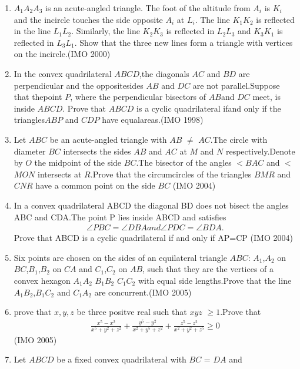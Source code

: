 \begin{enumerate}
\item ${A_{1}} {A_{2}} {A_{3}}$ is an acute-angled triangle. The foot of the altitude from ${A_{i}}$ is ${K_{i}}$ and the incircle touches the side opposite ${A_{i}}$ at ${L_{i}}$. The line ${K_{1}}{K_{2}}$ is reflected in the line ${L_{1}}{L_{2}}$. Similarly, the line ${K_{2}}{K_{3}}$ is reflected in ${L_{2}}{L_{3}}$ and ${K_{3}}{K_{1}}$ is reflected in ${L_{3}}{L_{1}}$. Show that the three new lines form a triangle with vertices on the incircle.\hfill(IMO 2000)
\item In the convex quadrilateral $ABCD$,the diagonals $AC$ and $BD$ are perpendicular and the oppositesides $AB$ and $DC$ are not parallel.Suppose that thepoint $P$, where the perpendicular bisectors of $AB$and $DC$ meet, is inside $ABCD$. Prove that $ABCD$ is a cyclic quadrilateral ifand only if the triangles$ABP$ and $CDP$ have equalareas.\hfill(IMO 1998) 
\item Let $ABC$ be an acute-angled triangle  with $AB$ $\neq$ $AC$.The circle with diameter $BC$ intersects the sides $AB$ and $AC$ at $M$ and $N$ respectively.Denote by $O$ the midpoint of the side $BC$.The bisector of the angles $<$$BAC$ and $<$$MON$ intersects at $R$.Prove that the circumcircles of the triangles $BMR$ and $CNR$ have a common point on the side $BC$ \hfill(IMO 2004)
 \item In a convex quadrilateral ABCD the diagonal BD does not bisect the angles ABC and CDA.The point P lies inside ABCD and satisfies
 \begin{align*}
 \angle{PBC}=\angle{DBA} and \angle{PDC}=\angle{BDA}.
 \end{align*}
Prove that ABCD is a cyclic quadrilateral if and only if AP=CP \hfill(IMO 2004)
	\item Six points are chosen on the sides of an equilateral triangle $ABC$:
     $A_1$,$A_2$ on $BC$,$B_1$,$B_2$ on $CA$ and $C_1$,$C_2$ on $AB$, such that they are the vertices of a convex hexagon $A_1A_2$ $B_1B_2$ $C_1C_2$ with equal side lengths.Prove that the line $A_1B_2$,$B_1C_2$ and $C_1A_2$ are concurrent.\hfill(IMO 2005)
     \item prove that $x,y,z$ be three positve real such that $xyz$ $\geq{1}$.Prove that                                                            \begin{align*}
\frac{x^5-x^2}{x^5+y^2+z^2} + \frac{y^5-y^2}{x^2+y^5+z^2} + \frac{z^5-z^2} {x^2+y^2+z^5} \geq{0}                                                 \end{align*} \hfill(IMO 2005)
\item Let $ABCD$ be a fixed convex quadrilateral with $BC$ = $DA$ and

\end{enumerate}
